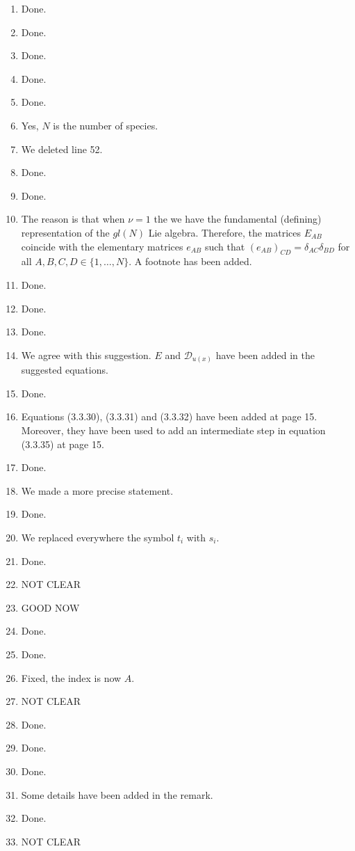 \documentclass[10pt]{article}
\numberwithin{equation}{section}
\numberwithin{equation}{subsection}
\begin{document}
		\begin{enumerate}
			\item Done.
			\item Done.
			\item Done.
			\item Done.
			\item Done.
			\item Yes, $N$ is the number of species. 
			\item We deleted line 52.
			\item Done.
			\item Done.
			\item The reason is that when $\nu=1$ the we have the fundamental (defining) representation of the $gl(N)$ Lie algebra. Therefore, the matrices $E_{AB}$ coincide with the elementary matrices $e_{AB}$ such that $(e_{AB})_{CD}=\delta_{AC}\delta_{BD}$ for all $A,B,C,D\in\{1,\ldots,N\}$. A footnote has been added.
			\item Done.
			\item Done.
			\item Done.
			\item We agree with this suggestion. $E$ and $\mathcal{D}_{u(x)}$ have been added in the suggested equations.
			\item Done.
			\item Equations (3.3.30), (3.3.31) and (3.3.32) have been added at page 15. Moreover, they have been used to add an intermediate step in equation (3.3.35) at page 15.
			\item Done.
			\item We made a more precise statement. 
			\item Done.
			\item We replaced everywhere the symbol $t_{i}$ with $s_{i}$.
			\item Done. 
			\item NOT CLEAR
			\item GOOD NOW
			\item Done.
			\item Done.
			\item Fixed, the index is now $A$.
			\item NOT CLEAR
			\item Done.
			\item Done.
			\item Done.
			\item Some details have been added in the remark.
			\item Done.
			\item NOT CLEAR

\end{enumerate}
\end{document}
